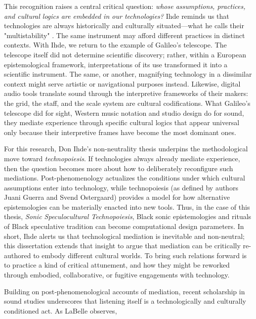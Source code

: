 This recognition raises a central critical question: \emph{whose assumptions, practices, and cultural logics are embedded in our technologies?} Ihde reminds us that technologies are always historically and culturally situated---what he calls their "multistability" \parencite[pp. 144-145]{Ihde_1990}. The same instrument may afford different practices in distinct contexts. With Ihde, we return to the example of Galileo’s telescope. The telescope itself did not determine scientific discovery; rather, within a European epistemological framework, interpretations of its use transformed it into a scientific instrument. The same, or another, magnifying technology in a dissimilar context might serve artistic or navigational purposes instead. Likewise, digital audio tools translate sound through the interpretive frameworks of their makers: the grid, the staff, and the scale system are cultural codifications. What Galileo’s telescope did for sight, Western music notation and studio design do for sound, they mediate experience through specific cultural logics that appear universal only because their interpretive frames have become the most dominant ones.

For this research, Don Ihde’s non-neutrality thesis underpins the methodological move toward \emph{technopoiesis}. If technologies always already mediate experience, then the question becomes more about how to deliberately reconfigure such mediations. Post-phenomenology actualizes the conditions under which cultural assumptions enter into technology, while technopoiesis (as defined by authors Juani Guerra and Svend Ostergaard) \parencites{Guerra_Ostergaard_2017} provides a model for how alternative epistemologies can be materially enacted into new tools. Thus, in the case of this thesis, \emph{Sonic Speculocultural Technopoiesis}, Black sonic epistemologies and rituals of Black speculative tradition can become computational design parameters. In short, Ihde alerts us that technological mediation is inevitable and non-neutral; this dissertation extends that insight to argue that mediation can be critically re-authored to embody different cultural worlds. To bring such relations forward is to practice a kind of critical attunement, and how they might be reworked through embodied, collaborative, or fugitive engagements with technology.

Building on post‐phenomenological accounts of mediation, recent scholarship in sound studies underscores that listening itself is a technologically and culturally conditioned act. As LaBelle observes, 

